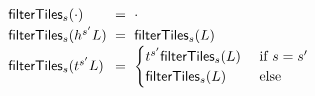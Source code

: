 \begin{figure}
  \newcommand{\spacing}{\ \ \ \ \ }
  \[
  \setlength{\fboxsep}{1pt}
  \arraycolsep=3pt\def\arraystretch{1.25}\begin{array}{lcl}
      \filterTiles{s}{\cdot} & = & \cdot \\
      \filterTiles{s}{\shard^{s'}\selection} & = & \filterTiles{s}{\selection} \\
      \filterTiles{s}{\tile^{s'}\selection} & = &
        \begin{cases}
          \tile^{s'}\filterTiles{s}{\selection} & \text{ if } s = s' \\
          \filterTiles{s}{\selection} & \text{ else }
        \end{cases}
\end{array}\]
  \vspace{-2px}
  \vspace{-2px}
  \end{figure}